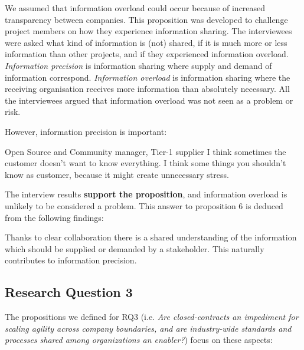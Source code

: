 
We assumed that information overload could occur because of increased transparency between companies. This proposition was developed to challenge project members on how they experience information sharing. The interviewees were asked what kind of information is (not) shared, if it is much more or less information than other projects, and if they experienced information overload. {\em Information precision} is information sharing where supply and demand of information correspond. {\em Information overload} is information sharing where the receiving organisation receives more information than absolutely necessary. All the interviewees argued that information overload was not seen as a problem or risk.

However, information precision is important:

\begin{aquote}{Open Source and Community manager, Tier-1 supplier}
I think sometimes the customer doesn't want to know everything. I think some things you shouldn't know as customer, because it might create unnecessary stress.
\end{aquote}

%

The interview results {\bf support the proposition}, and information overload is unlikely to be considered a problem. This answer to proposition 6 is deduced from the following findings:

 Thanks to clear collaboration there is a shared understanding of the information which should be supplied or demanded by a stakeholder. This naturally contributes to information precision.

\subsection{Research Question 3}\label{sec:ResearchQuestion3}

The propositions we defined for  
RQ3 (i.e. {\em Are closed-contracts an impediment for scaling agility across company boundaries, and 
are industry-wide standards and processes shared among organizations an enabler?}) focus on these aspects:

